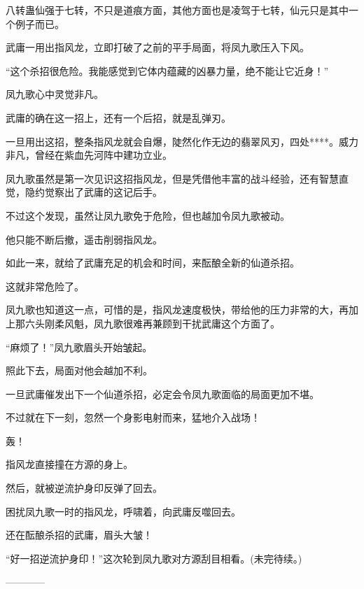 \begin{this_body}
八转蛊仙强于七转，不只是道痕方面，其他方面也是凌驾于七转，仙元只是其中一个例子而已。

武庸一用出指风龙，立即打破了之前的平手局面，将凤九歌压入下风。

“这个杀招很危险。我能感觉到它体内蕴藏的凶暴力量，绝不能让它近身！”

凤九歌心中灵觉非凡。

武庸的确在这一招上，还有一个后招，就是乱弹刃。

一旦用出这招，整条指风龙就会自爆，陡然化作无边的翡翠风刃，四处****。威力非凡，曾经在紫血先河阵中建功立业。

凤九歌虽然是第一次见识这招指风龙，但是凭借他丰富的战斗经验，还有智慧直觉，隐约觉察出了武庸的这记后手。

不过这个发现，虽然让凤九歌免于危险，但也越加令凤九歌被动。

他只能不断后撤，遥击削弱指风龙。

如此一来，就给了武庸充足的机会和时间，来酝酿全新的仙道杀招。

这就非常危险了。

凤九歌也知道这一点，可惜的是，指风龙速度极快，带给他的压力非常的大，再加上那六头刚柔风魁，凤九歌很难再兼顾到干扰武庸这个方面了。

“麻烦了！”凤九歌眉头开始皱起。

照此下去，局面对他会越加不利。

一旦武庸催发出下一个仙道杀招，必定会令凤九歌面临的局面更加不堪。

不过就在下一刻，忽然一个身影电射而来，猛地介入战场！

轰！

指风龙直接撞在方源的身上。

然后，就被逆流护身印反弹了回去。

困扰凤九歌一时的指风龙，呼啸着，向武庸反噬回去。

还在酝酿杀招的武庸，眉头大皱！

“好一招逆流护身印！”这次轮到凤九歌对方源刮目相看。(未完待续。)

------------

\end{this_body}

